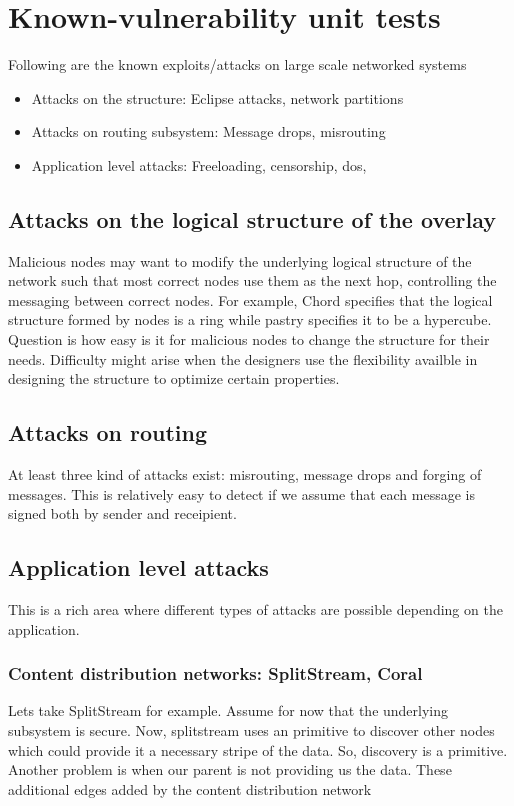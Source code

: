  
 
\section{Known-vulnerability unit tests} 
 
Following are the known exploits/attacks on large scale networked systems 
\begin{itemize} 
\item{Attacks on the structure}: Eclipse attacks, network partitions 
\item{Attacks on routing subsystem}: Message drops, misrouting 
\item{Application level attacks}: Freeloading, censorship, dos, 
\end{itemize} 
 
 
\subsection{Attacks on the logical structure of the overlay} 
Malicious nodes may want to modify the underlying logical structure of the network such that most correct nodes use them as the next hop, controlling the messaging between correct nodes. For example, Chord specifies that the logical structure formed by nodes is a ring while pastry specifies it to be a hypercube. Question is how easy is it for malicious nodes to change the structure for their needs. Difficulty might arise when the designers use the flexibility availble in designing the structure to optimize certain properties. 
 
\subsection{Attacks on routing} 
At least three kind of attacks exist: misrouting, message drops and forging of messages. This is relatively easy to detect if we assume that each message is signed both by sender and receipient. 
 
\subsection{Application level attacks} 
This is a rich area where different types of attacks are possible depending on the application.  
 
\subsubsection{Content distribution networks: SplitStream, Coral} 
Lets take SplitStream for example. Assume for now that the underlying subsystem is secure. Now, splitstream uses an primitive to discover other nodes which could provide it a necessary stripe of the data. So, discovery is a primitive. Another problem is when our parent is not providing us the data. These additional edges added by the content distribution network 
 
